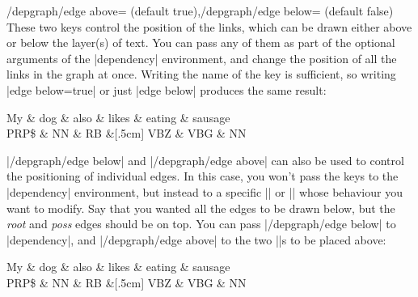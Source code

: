 \documentclass[a4paper]{ltxdoc}
\begin{document}
\begin{keylist}{/depgraph/edge above= (default true),/depgraph/edge below= (default false)}
   These two keys control the position of the links, which can be drawn either above or below the layer(s) of text. You can pass any of them as part of the optional arguments of the |dependency| environment, and change the position of all the links in the graph at once. Writing the name of the key is sufficient, so writing |edge below=true| or just |edge below| produces the same result:
\begin{codeexample}[]
\begin{dependency}
   \begin{deptext}[column sep=.7cm]
      My \& dog \& also \& likes \& eating \& sausage \\
      PRP\$ \& NN \& RB \&[.5cm] VBZ \& VBG \& NN \\
   \end{deptext}
\end{dependency}
\end{codeexample}
|/depgraph/edge below| and |/depgraph/edge above| can also be used to control the positioning of individual edges. In this case, you won't pass the keys to the |dependency| environment, but instead to a specific |\depedge| or |\deproot| whose behaviour you want to modify.
Say that you wanted all the edges to be drawn below, but the \emph{root} and \emph{poss} edges should be on top. You can pass |/depgraph/edge below| to |dependency|, and |/depgraph/edge above| to the two |\depedge|s to be placed above:
\begin{codeexample}[]
\begin{dependency}
   \begin{deptext}[column sep=.7cm]
      My \& dog \& also \& likes \& eating \& sausage \\
      PRP\$ \& NN \& RB \&[.5cm] VBZ \& VBG \& NN \\
   \end{deptext}
\end{dependency}
\end{codeexample}
\end{keylist}
\end{document}
